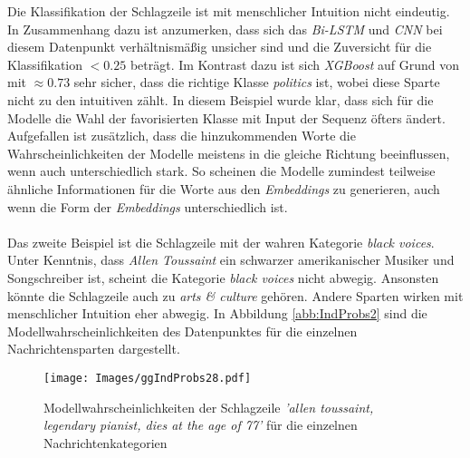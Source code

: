 \documentclass[a4paper,11pt]{article}
\begin{document}
Die Klassifikation der Schlagzeile ist mit menschlicher Intuition nicht eindeutig. In Zusammenhang dazu ist anzumerken, dass sich das \textit{Bi-LSTM} und \textit{CNN} bei diesem Datenpunkt verhältnismäßig unsicher sind und die Zuversicht für die Klassifikation $<  0.25$ beträgt. Im Kontrast dazu ist sich \textit{XGBoost} auf Grund von  mit $\approx 0.73$ sehr sicher, dass die richtige Klasse \textit{politics} ist, wobei diese Sparte nicht zu den intuitiven zählt. In diesem Beispiel wurde klar, dass sich für die Modelle die Wahl der favorisierten Klasse mit Input der Sequenz öfters ändert. Aufgefallen ist zusätzlich, dass die hinzukommenden Worte die Wahrscheinlichkeiten der Modelle meistens in die gleiche Richtung beeinflussen, wenn auch unterschiedlich stark. So scheinen die Modelle zumindest teilweise ähnliche Informationen für die Worte aus den \textit{Embeddings} zu generieren, auch wenn die Form der \textit{Embeddings} unterschiedlich ist.\\
\\
Das zweite Beispiel ist die Schlagzeile  mit der wahren Kategorie \textit{black voices}. Unter Kenntnis, dass \textit{Allen Toussaint} ein schwarzer amerikanischer Musiker und Songschreiber ist, scheint die Kategorie \textit{black voices} nicht abwegig. Ansonsten könnte die Schlagzeile auch zu \textit{arts \& culture} gehören. Andere Sparten wirken mit menschlicher Intuition eher abwegig. In Abbildung \ref{abb:IndProbs2} sind die Modellwahrscheinlichkeiten des Datenpunktes für die einzelnen Nachrichtensparten dargestellt.

\begin{figure}[H]
    \centering
\texttt{[image: Images/ggIndProbs28.pdf]} 
\caption{Modellwahrscheinlichkeiten der Schlagzeile \textit{'allen toussaint, legendary pianist, dies at the age of 77'} für die einzelnen Nachrichtenkategorien}
\label{abb:IndProbs28}
\end{figure}
\end{document}
